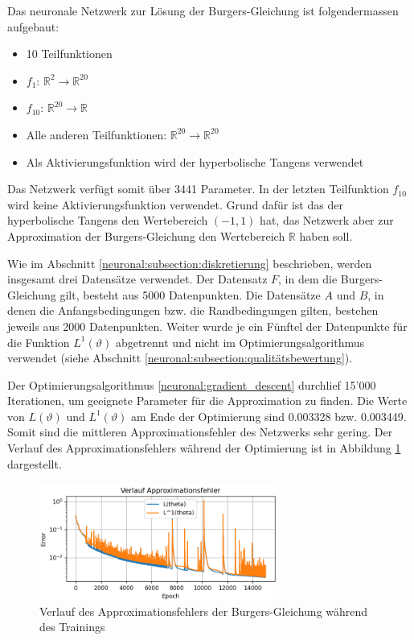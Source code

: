 Das neuronale Netzwerk zur Lösung der Burgers-Gleichung ist folgendermassen aufgebaut:
\begin{itemize}
    \item 10 Teilfunktionen
    \item \( f_1 \): \( \mathbb{R}^2 \longrightarrow \mathbb{R}^{20} \) 
    \item \( f_{10} \): \( \mathbb{R}^{20} \longrightarrow \mathbb{R} \)
    \item Alle anderen Teilfunktionen: \( \mathbb{R}^{20} \longrightarrow \mathbb{R}^{20} \)
    \item Als Aktivierungsfunktion wird der hyperbolische Tangens verwendet
\end{itemize}
Das Netzwerk verfügt somit über 3441 Parameter.
In der letzten Teilfunktion \( f_{10} \) wird keine Aktivierungsfunktion verwendet.
Grund dafür ist das der hyperbolische Tangens den Wertebereich \((-1, 1)\) hat, das Netzwerk aber zur Approximation der Burgers-Gleichung den Wertebereich \( \mathbb{R} \) haben soll.

Wie im Abschnitt \ref{neuronal:subsection:diskretierung} beschrieben, werden insgesamt drei Datensätze verwendet.
Der Datensatz \( F \), in dem die Burgers-Gleichung gilt, besteht aus 5000 Datenpunkten.
Die Datensätze \( A \) und \( B \), in denen die Anfangsbedingungen bzw. die Randbedingungen gilten, bestehen jeweils aus 2000 Datenpunkten.
Weiter wurde je ein Fünftel der Datenpunkte für die Funktion \( L^1(\vartheta) \) abgetrennt und nicht im Optimierungsalgorithmus verwendet (siehe Abschnitt \ref{neuronal:subsection:qualitätsbewertung}).

Der Optimierungsalgorithmus \ref{neuronal:gradient_descent} durchlief 15'000 Iterationen, um geeignete Parameter für die Approximation zu finden.
Die Werte von \( L(\vartheta) \) und \( L^1(\vartheta) \) am Ende der Optimierung sind 0.003328 bzw. 0.003449.
Somit sind die mittleren Approximationsfehler des Netzwerks sehr gering.
Der Verlauf des Approximationsfehlers während der Optimierung ist in Abbildung \ref{fig:fehler_burgers} dargestellt.
\begin{figure}
    \centering
    \hspace*{-0.1\textwidth}
    \includegraphics[width=0.7\textwidth]{papers/neuronal/images/approximation_error_burgers.png}
    \caption{Verlauf des Approximationsfehlers der Burgers-Gleichung während des Trainings}
    \label{fig:fehler_burgers}
\end{figure}

